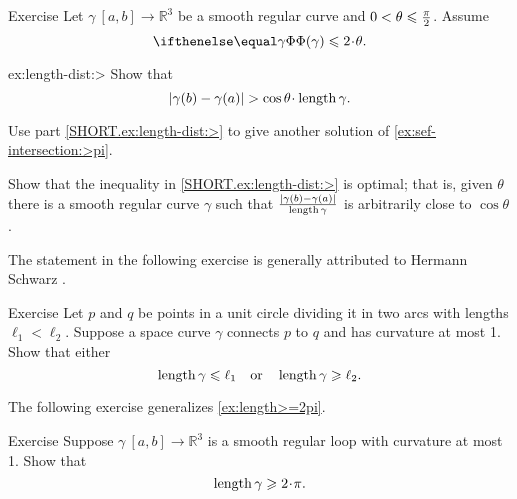 \begin{thm}{Exercise}\label{ex:length-dist}
Let $\gamma\:[a,b]\to \mathbb{R}^3$ be a smooth regular curve and $0\z<\theta\z\le\tfrac\pi2$.
Assume 
\[\tc\gamma\le 2\cdot\theta.\]

\begin{subthm}{ex:length-dist:>} Show that
\[|\gamma(b)-\gamma(a)|> \cos\theta\cdot\length\gamma.\]
\end{subthm}

\begin{subthm}{} Use part \ref{SHORT.ex:length-dist:>} to give another solution of \ref{ex:sef-intersection:>pi}.
\end{subthm}

\begin{subthm}{} Show that the inequality in \ref{SHORT.ex:length-dist:>} is optimal; that is, given 
$\theta$ there is a smooth regular curve $\gamma$ such that $\frac{|\gamma(b)-\gamma(a)|}{\mathop{\rm length}\nolimits\gamma}$ is arbitrarily close to $\cos\theta$.
\end{subthm}

\end{thm}

The statement in the following exercise is generally attributed to Hermann Schwarz \cite{shur}.

\begin{thm}{Exercise}\label{ex:schwartz}
Let $p$ and $q$ be points in a unit circle dividing it in two arcs with lengths $\ell_1<\ell_2$.
Suppose a space curve $\gamma$ connects $p$ to $q$ and has curvature at most 1. Show that either
\[\mathop{\rm length}\nolimits \gamma\leqslant \ell_1
\quad\text{or}\quad
\mathop{\rm length}\nolimits \gamma\geqslant \ell_2.
\]
\end{thm}

The following exercise generalizes \ref{ex:length>=2pi}.

\begin{thm}{Exercise}\label{ex:loop}
Suppose $\gamma\:[a,b]\to \mathbb{R}^3$ is a smooth regular loop with curvature at most 1.
Show that 
\[\length\gamma\ge2\cdot\pi.\]

\end{thm}


